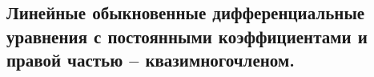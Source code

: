 \subsection{Линейные обыкновенные дифференциальные уравнения с постоянными коэффициентами и правой частью – квазимногочленом.}
